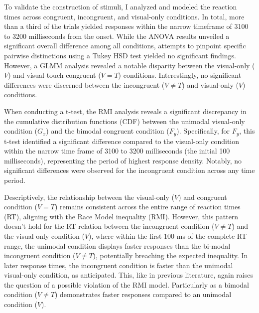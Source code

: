 \documentclass[12pt,oneside,openright]{report}
\begin{document}


To validate the construction of stimuli, I analyzed and modeled the reaction times across congruent, incongruent, and visual-only conditions. In total, more than a third of the trials yielded responses within the narrow timeframe of 3100 to 3200 milliseconds from the onset. While the ANOVA results unveiled a significant overall difference among all conditions, attempts to pinpoint specific pairwise distinctions using a Tukey HSD test yielded no significant findings. However, a GLMM analysis revealed a notable disparity between the visual-only ($V$) and visual-touch congruent ($V=T$) conditions. Interestingly, no significant differences were discerned between the incongruent ($V \neq T$) and visual-only ($V$) conditions.

When conducting a t-test, the RMI analysis reveals a significant discrepancy in the cumulative distribution functions (CDF) between the unimodal visual-only condition ($G_x$) and the bimodal congruent condition ($F_y$). Specifically, for $F_y$, this t-test identified a significant difference compared to the visual-only condition within the narrow time frame of 3100 to 3200 milliseconds (the initial 100 milliseconds), representing the period of highest response density. Notably, no significant differences were observed for the incongruent condition across any time period.

Descriptively, the relationship between the visual-only ($V$) and congruent condition ($V=T$) remains consistent across the entire range of reaction times (RT), aligning with the Race Model inequality (RMI). However, this pattern doesn’t hold for the RT relation between the incongruent condition ($V \neq T$) and the visual-only condition ($V$), where within the first 100 ms of the complete RT range, the unimodal condition displays faster responses than the bi-modal incongruent condition ($V \neq T$), potentially breaching the expected inequality. In later response times, the incongruent condition is faster than the unimodal visual-only condition, as anticipated. This, like in previous literature, again raises the question of a possible violation of the RMI model. Particularly as a bimodal condition ($V \neq T$) demonstrates faster responses compared to an unimodal condition ($V$).
\end{document}
